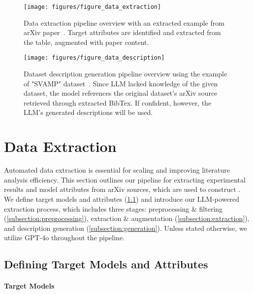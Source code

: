 \begin{figure*}[t!]
\centering
\texttt{[image: figures/figure\_data\_extraction]}
\caption{Data extraction pipeline overview with an extracted example from arXiv paper~\citep{cheng2023batch}. Target attributes are identified and extracted from the table, augmented with paper content.}
\label{fig:data_extraction}
\end{figure*}


\begin{figure*}[t!]
\centering
\texttt{[image: figures/figure\_data\_description]}
\caption{Dataset description generation pipeline overview using the example of "SVAMP" dataset~\citep{patel2021nlp}. Since LLM lacked knowledge of the given dataset, the model references the original dataset's arXiv source retrieved through extracted BibTex. If confident, however, the LLM's generated descriptions will be used.}
\label{fig:data_description}
\end{figure*}


\section{Data Extraction}
\label{section:approach}

Automated data extraction is essential for scaling and improving literature analysis efficiency. 
This section outlines our pipeline for extracting experimental results and model attributes from arXiv sources, which are used to construct \datasetname.
We define target models and attributes (\cref{subsection:attributes}) and introduce our LLM-powered extraction process, which includes three stages: preprocessing \& filtering (\cref{subsection:preprocessing}), extraction \& augmentation (\cref{subsection:extraction}), and description generation (\cref{subsection:generation}).
Unless stated otherwise, we utilize GPT-4o \citep{hurst2024gpt} throughout the pipeline.

\subsection{Defining Target Models and Attributes}
\label{subsection:attributes}

\paragraph{Target Models} 

